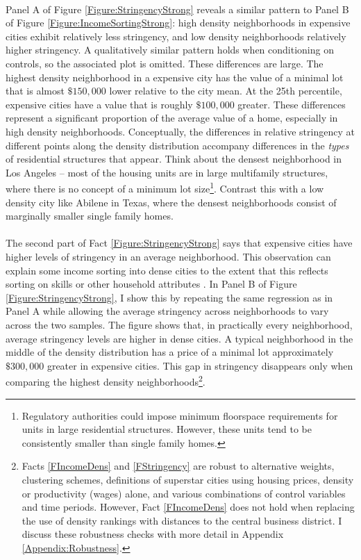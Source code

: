 \documentclass[12pt]{article}
\begin{document}
	\paragraph*{}
	Panel A of Figure \ref{Figure:StringencyStrong} reveals a similar pattern to Panel B of Figure \ref{Figure:IncomeSortingStrong}: high density neighborhoods in expensive cities exhibit relatively less stringency, and low density neighborhoods relatively higher stringency. A qualitatively similar pattern holds when conditioning on controls, so the associated plot is omitted. These differences are large. The highest density neighborhood in a expensive city has the value of a minimal lot that is almost $\$ 150,000$ lower relative to the city mean. At the 25th percentile, expensive cities have a value that is roughly $\$ 100,000$ greater. These differences represent a significant proportion of the average value of a home, especially in high density neighborhoods. Conceptually, the differences in relative stringency at different points along the density distribution accompany differences in the \textit{types} of residential structures that appear. Think about the densest neighborhood in Los Angeles -- most of the housing units are in large multifamily structures, where there is no concept of a minimum lot size\footnote{Regulatory authorities could impose minimum floorspace requirements for units in large residential structures. However, these units tend to be consistently smaller than single family homes.}. Contrast this with a low density city like Abilene in Texas, where the densest neighborhoods consist of marginally smaller single family homes. 
	
	
	\paragraph*{}
	The second part of Fact \ref{Figure:StringencyStrong} says that expensive cities have higher levels of stringency in an average neighborhood. This observation can explain some income sorting into dense cities to the extent that this reflects sorting on skills or other household attributes \citep{diamond2016, citysizewagegap}. In Panel B of Figure \ref{Figure:StringencyStrong}, I show this by repeating the same regression as in Panel A while allowing the average stringency across neighborhoods to vary across the two samples. The figure shows that, in practically every neighborhood, average stringency levels are higher in dense cities. A typical neighborhood in the middle of the density distribution has a price of a minimal lot approximately $\$300,000$ greater in expensive cities. This gap in stringency disappears only when comparing the highest density neighborhoods\footnote{Facts \ref{FIncomeDens} and \ref{FStringency} are robust to alternative weights, clustering schemes, definitions of superstar cities using housing prices, density or productivity (wages) alone, and various combinations of control variables and time periods. However, Fact \ref{FIncomeDens} does not hold when replacing the use of density rankings with distances to the central business district. I discuss these robustness checks with more detail in Appendix \ref{Appendix:Robustness}.}.
\end{document}
